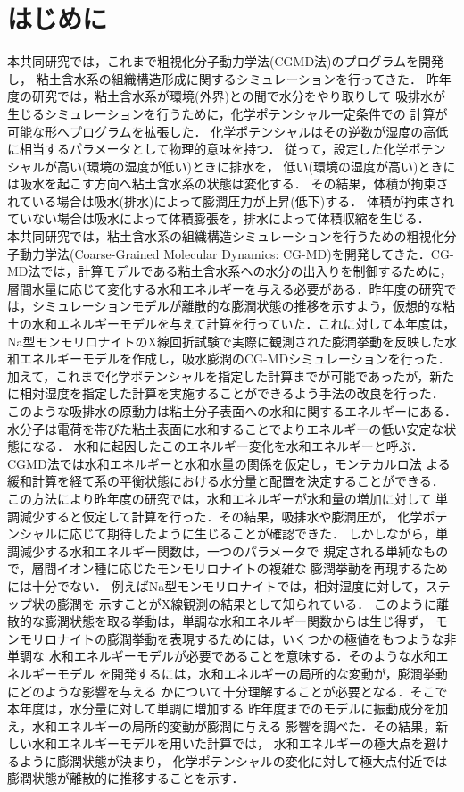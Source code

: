 \section{はじめに}
本共同研究では，これまで粗視化分子動力学法(CGMD法)のプログラムを開発し，
粘土含水系の組織構造形成に関するシミュレーションを行ってきた．
昨年度の研究では，粘土含水系が環境(外界)との間で水分をやり取りして
吸排水が生じるシミュレーションを行うために，化学ポテンシャル一定条件での
計算が可能な形へプログラムを拡張した．
化学ポテンシャルはその逆数が湿度の高低に相当するパラメータとして物理的意味を持つ．
従って，設定した化学ポテンシャルが高い(環境の湿度が低い)ときに排水を，
低い(環境の湿度が高い)ときには吸水を起こす方向へ粘土含水系の状態は変化する．
その結果，体積が拘束されている場合は吸水(排水)によって膨潤圧力が上昇(低下)する．
体積が拘束されていない場合は吸水によって体積膨張を，排水によって体積収縮を生じる．
\\
本共同研究では，粘土含水系の組織構造シミュレーションを行うための粗視化分子動力学法(Coarse-Grained Molecular Dynamics: CG-MD)を開発してきた．CG-MD法では，計算モデルである粘土含水系への水分の出入りを制御するために，層間水量に応じて変化する水和エネルギーを与える必要がある．昨年度の研究では，シミュレーションモデルが離散的な膨潤状態の推移を示すよう，仮想的な粘土の水和エネルギーモデルを与えて計算を行っていた．これに対して本年度は，Na型モンモリロナイトのX線回折試験で実際に観測された膨潤挙動を反映した水和エネルギーモデルを作成し，吸水膨潤のCG-MDシミュレーションを行った．加えて，これまで化学ポテンシャルを指定した計算までが可能であったが，新たに相対湿度を指定した計算を実施することができるよう手法の改良を行った．
\\
%
このような吸排水の原動力は粘土分子表面への水和に関するエネルギーにある．
水分子は電荷を帯びた粘土表面に水和することでよりエネルギーの低い安定な状態になる．
水和に起因したこのエネルギー変化を水和エネルギーと呼ぶ．
CGMD法では水和エネルギーと水和水量の関係を仮定し，モンテカルロ法
よる緩和計算を経て系の平衡状態における水分量と配置を決定することができる．
%
この方法により昨年度の研究では，水和エネルギーが水和量の増加に対して
単調減少すると仮定して計算を行った．その結果，吸排水や膨潤圧が，
化学ポテンシャルに応じて期待したように生じることが確認できた．
しかしながら，単調減少する水和エネルギー関数は，一つのパラメータで
規定される単純なもので，層間イオン種に応じたモンモリロナイトの複雑な
膨潤挙動を再現するためには十分でない．
例えばNa型モンモリロナイトでは，相対湿度に対して，ステップ状の膨潤を
示すことがX線観測の結果として知られている．
このように離散的な膨潤状態を取る挙動は，単調な水和エネルギー関数からは生じ得ず，
モンモリロナイトの膨潤挙動を表現するためには，いくつかの極値をもつような非単調な
水和エネルギーモデルが必要であることを意味する．そのような水和エネルギーモデル
を開発するには，水和エネルギーの局所的な変動が，膨潤挙動にどのような影響を与える
かについて十分理解することが必要となる．そこで本年度は，水分量に対して単調に増加する
昨年度までのモデルに振動成分を加え，水和エネルギーの局所的変動が膨潤に与える
影響を調べた．その結果，新しい水和エネルギーモデルを用いた計算では，
水和エネルギーの極大点を避けるように膨潤状態が決まり，
化学ポテンシャルの変化に対して極大点付近では膨潤状態が離散的に推移することを示す．


